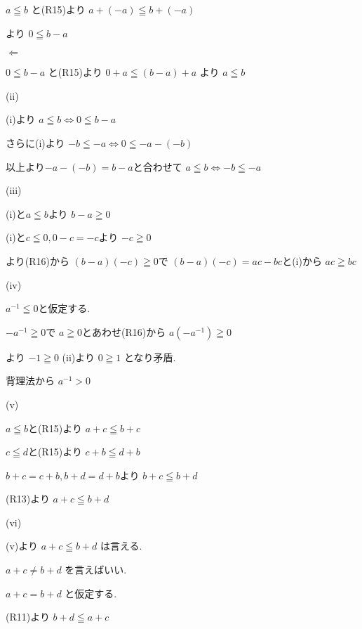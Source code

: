 \documentclass{jsarticle}
\begin{document}
       
       $a\leqq b$
       と(R15)より
       $a+(-a)\leqq b+(-a)$
       
       より
       $0\leqq b-a$
       
       
       $\Leftarrow$
       
       
       $0\leqq b-a$
       と(R15)より
       $0+a\leqq (b-a)+a$
       より
       $a\leqq b$
       
       
       (ii)
       
       
       (i)より
       $a\leqq b \Leftrightarrow 0\leqq b-a$
       
       さらに(i)より
       $-b\leqq -a \Leftrightarrow 0\leqq -a-(-b)$
       
       以上より$-a-(-b)=b-a$と合わせて
       $a\leqq b \Leftrightarrow -b\leqq -a$
       
       
       (iii)
       
       
       (i)と$a\leqq b$より
       $b-a \geqq 0$
       
       (i)と$c\leqq 0,0-c=-c$より
       $-c\geqq 0$
       
       より(R16)から
       $(b-a)(-c)\geqq 0$で
       $(b-a)(-c)=ac-bc$と(i)から
       $ac\geqq bc$
       
       
       (iv)
       
       $a^{-1}\leqq 0$と仮定する.
       
       $-a^{-1}\geqq 0$で
       $a\geqq 0$とあわせ(R16)から
       $a(-a^{-1})\geqq 0$
       
       より
       $-1\geqq 0$
       (ii)より
       $0\geqq 1$
       となり矛盾.
       
       背理法から
       $a^{-1}>0$
       
       
       (v)
       
       $a\leqq b$と(R15)より
       $a+c \leqq b+c$
       
       $c\leqq d$と(R15)より
       $c+b \leqq d+b$
       
       $b+c=c+b,b+d=d+b$より
       $b+c \leqq b+d$
       
       (R13)より
       $a+c\leqq b+d$
       
       
       (vi)
       
       
       (v)より
       $a+c\leqq b+d$
       は言える.
       
       $a+c\neq b+d$
       を言えばいい.
       
       $a+c = b+d$
       と仮定する.
       
       (R11)より
       $b+d\leqq a+c$
       
\end{document}
